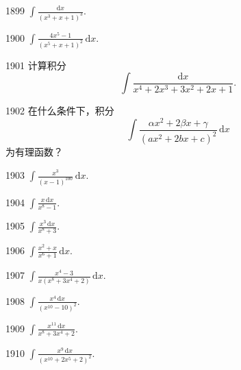 \begin{prob}[S]{1899}
$\displaystyle \int \frac{\mathrm{d}x}{(x^3 + x + 1)^3}$.
\end{prob}

\begin{prob}[S]{1900}
$\displaystyle \int \frac{4x^5 - 1}{(x^5 + x + 1)^2}\,\mathrm{d}x$.
\end{prob}

\begin{prob}[M]{1901}
计算积分
\[
\int \frac{\mathrm{d}x}{x^4 + 2x^3 + 3x^2 + 2x + 1}.
\]
\end{prob}

\begin{prob}[M]{1902}
在什么条件下，积分
\[
\int \frac{\alpha x^2 + 2\beta x + \gamma}{(ax^2 + 2bx + c)^2}\,\mathrm{d}x
\]
为有理函数？
\end{prob}


\begin{prob}[S]{1903}
$\displaystyle \int \frac{x^3}{(x - 1)^{100}}\,\mathrm{d}x$.
\end{prob}

\begin{prob}[S]{1904}
$\displaystyle \int \frac{x\,\mathrm{d}x}{x^8 - 1}$.
\end{prob}

\begin{prob}[S]{1905}
$\displaystyle \int \frac{x^3\,\mathrm{d}x}{x^8 + 3}$.
\end{prob}

\begin{prob}[S]{1906}
$\displaystyle \int \frac{x^2 + x}{x^6 + 1}\,\mathrm{d}x$.
\end{prob}

\begin{prob}[S]{1907}
$\displaystyle \int \frac{x^4 - 3}{x(x^8 + 3x^4 + 2)}\,\mathrm{d}x$.
\end{prob}

\begin{prob}[S]{1908}
$\displaystyle \int \frac{x^4\,\mathrm{d}x}{(x^{10} - 10)^2}$.
\end{prob}

\begin{prob}[S]{1909}
$\displaystyle \int \frac{x^{11}\,\mathrm{d}x}{x^8 + 3x^4 + 2}$.
\end{prob}

\begin{prob}[S]{1910}
$\displaystyle \int \frac{x^9\,\mathrm{d}x}{(x^{10} + 2x^5 + 2)^2}$.
\end{prob}

